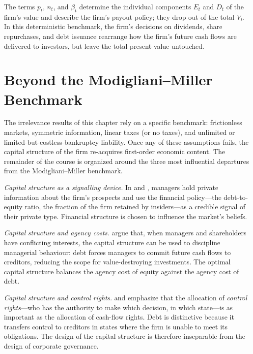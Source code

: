 \documentclass[11pt,a4paper,oneside]{book}
\theoremstyle{plain}
\theoremstyle{definition}
\theoremstyle{remark}
\numberwithin{equation}{chapter}
\begin{document}
The terms $p_t$, $n_t$, and $\beta_t$ determine the individual components $E_t$ and $D_t$ of the firm's value and describe the firm's payout policy; they drop out of the total $V_t$.
In this deterministic benchmark, the firm's decisions on dividends, share repurchases, and debt issuance rearrange how the firm's future cash flows are delivered to investors, but leave the total present value untouched.

\section{Beyond the Modigliani--Miller Benchmark}
\label{sec:beyond-mm}

The irrelevance results of this chapter rely on a specific benchmark: frictionless markets, symmetric information, linear taxes (or no taxes), and unlimited or limited-but-costless-bankruptcy liability.
Once any of these assumptions fails, the capital structure of the firm re-acquires first-order economic content.
The remainder of the course is organized around the three most influential departures from the Modigliani--Miller benchmark.

\emph{Capital structure as a signalling device.}
In \citet{Ross1977} and \citet{LelandPyle1977}, managers hold private information about the firm's prospects and use the financial policy---the debt-to-equity ratio, the fraction of the firm retained by insiders---as a credible signal of their private type.
Financial structure is chosen to influence the market's beliefs.

\emph{Capital structure and agency costs.}
\citet{JensenMeckling1976} argue that, when managers and shareholders have conflicting interests, the capital structure can be used to discipline managerial behaviour: debt forces managers to commit future cash flows to creditors, reducing the scope for value-destroying investments.
The optimal capital structure balances the agency cost of equity against the agency cost of debt.

\emph{Capital structure and control rights.}
\citet{AghionBolton1992} and \citet{HarrisRaviv1989} emphasize that the allocation of \emph{control rights}---who has the authority to make which decision, in which state---is as important as the allocation of cash-flow rights.
Debt is distinctive because it transfers control to creditors in states where the firm is unable to meet its obligations.
The design of the capital structure is therefore inseparable from the design of corporate governance.
\end{document}
